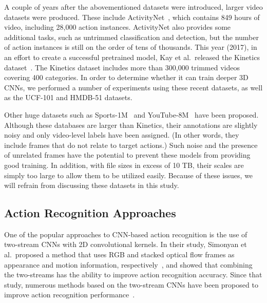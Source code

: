 \documentclass[10pt,twocolumn,letterpaper]{article}
\begin{document}
    A couple of years after the abovementioned datasets were introduced, larger video datasets were produced.
    These include ActivityNet~\cite{activitynet}, which contains 849 hours of video, including 28,000 action instances.
    ActivityNet also provides some additional tasks, such as untrimmed classification and detection,
    but the number of action instances is still on the order of tens of thousands.
    This year (2017), in an effort to create a successful pretrained model,
    Kay et al.\ released the Kinetics dataset~\cite{Kinetics}.
    The Kinetics dataset includes more than 300,000 trimmed videos covering 400 categories.
    In order to determine whether it can train deeper 3D CNNs,
    we performed a number of experiments using these recent datasets, as well as the UCF-101 and HMDB-51 datasets.

    Other huge datasets such as Sports-1M~\cite{KarpathyCVPR14} and YouTube-8M~\cite{YouTube8M} have been proposed.
    Although these databases are larger than Kinetics,
    their annotations are slightly noisy and only video-level labels have been assigned.
    (In other words, they include frames that do not relate to target actions.)
    Such noise and the presence of unrelated frames have the potential to prevent these models from providing good training.
    In addition, with file sizes in excess of 10 TB, their scales are simply too large to allow them to be utilized easily.
    Because of these issues, we will refrain from discussing these datasets in this study.

  \subsection{Action Recognition Approaches}
    One of the popular approaches to CNN-based action recognition is the use of two-stream CNNs with 2D convolutional kernels.
    In their study, Simonyan et al.\ proposed a method that
    uses RGB and stacked optical flow frames as appearance and motion information, respectively~\cite{Simonyan2014},
    and showed that combining the two-streams has the ability to improve action recognition accuracy.
    Since that study, numerous methods based on the two-stream CNNs have been proposed
    to improve action recognition performance~\cite{STResNet,feichtenhofer2017multiplier,Feichtenhofer16,Wang2015TDD,VeryDeepTwo,Wang2016TSN}.
    
\end{document}
